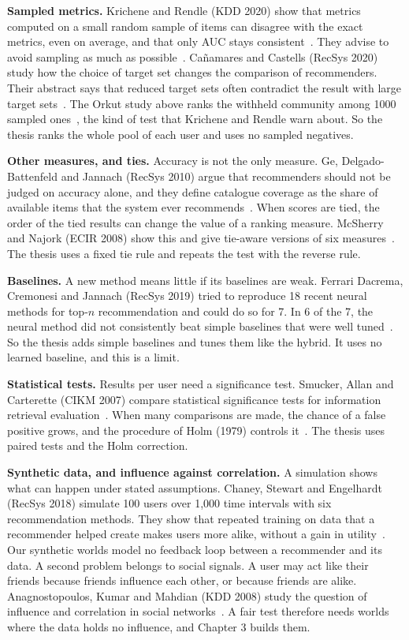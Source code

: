 \textbf{Sampled metrics.} Krichene and Rendle (KDD 2020) show that metrics computed on a small random sample of items can disagree with the exact metrics, even on average, and that only AUC stays consistent~. They advise to avoid sampling as much as possible~. Ca{\~n}amares and Castells (RecSys 2020) study how the choice of target set changes the comparison of recommenders. Their abstract says that reduced target sets often contradict the result with large target sets~. The Orkut study above ranks the withheld community among 1000 sampled ones~, the kind of test that Krichene and Rendle warn about. So the thesis ranks the whole pool of each user and uses no sampled negatives.

\textbf{Other measures, and ties.} Accuracy is not the only measure. Ge, Delgado-Battenfeld and Jannach (RecSys 2010) argue that recommenders should not be judged on accuracy alone, and they define catalogue coverage as the share of available items that the system ever recommends~. When scores are tied, the order of the tied results can change the value of a ranking measure. McSherry and Najork (ECIR 2008) show this and give tie-aware versions of six measures~. The thesis uses a fixed tie rule and repeats the test with the reverse rule.

\textbf{Baselines.} A new method means little if its baselines are weak. Ferrari Dacrema, Cremonesi and Jannach (RecSys 2019) tried to reproduce 18 recent neural methods for top-$n$ recommendation and could do so for 7. In 6 of the 7, the neural method did not consistently beat simple baselines that were well tuned~. So the thesis adds simple baselines and tunes them like the hybrid. It uses no learned baseline, and this is a limit.

\textbf{Statistical tests.} Results per user need a significance test. Smucker, Allan and Carterette (CIKM 2007) compare statistical significance tests for information retrieval evaluation~. When many comparisons are made, the chance of a false positive grows, and the procedure of Holm (1979) controls it~. The thesis uses paired tests and the Holm correction.

\textbf{Synthetic data, and influence against correlation.} A simulation shows what can happen under stated assumptions. Chaney, Stewart and Engelhardt (RecSys 2018) simulate 100 users over 1,000 time intervals with six recommendation methods. They show that repeated training on data that a recommender helped create makes users more alike, without a gain in utility~. Our synthetic worlds model no feedback loop between a recommender and its data. A second problem belongs to social signals. A user may act like their friends because friends influence each other, or because friends are alike. Anagnostopoulos, Kumar and Mahdian (KDD 2008) study the question of influence and correlation in social networks~. A fair test therefore needs worlds where the data holds no influence, and Chapter 3 builds them.

